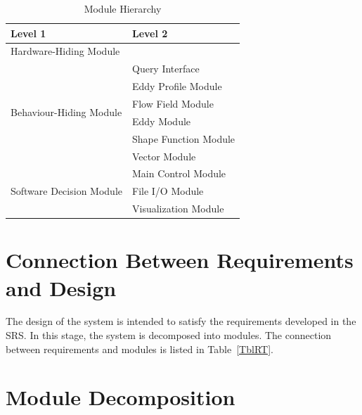 \documentclass[12pt, titlepage]{article}
\begin{document}
\begin{table}[h!]
\centering
\begin{tabular}{p{} p{}}
\toprule
\textbf{Level 1} & \textbf{Level 2}\\
\midrule

{Hardware-Hiding Module} & ~ \\
\midrule

\multirow{6}{0.3\textwidth}{Behaviour-Hiding Module}
& Query Interface\\
& Eddy Profile Module\\
& Flow Field Module\\
& Eddy Module\\
& Shape Function Module\\
& Vector Module\\
\midrule

\multirow{3}{0.3\textwidth}{Software Decision Module} 
& Main Control Module\\
& File I/O Module\\
& Visualization Module\\
\bottomrule

\end{tabular}
\caption{Module Hierarchy}
\label{TblMH}
\end{table}

\section{Connection Between Requirements and Design} \label{SecConnection}

The design of the system is intended to satisfy the requirements developed in
the SRS. In this stage, the system is decomposed into modules. The connection
between requirements and modules is listed in Table~\ref{TblRT}.


\section{Module Decomposition} \label{SecMD}
\end{document}

